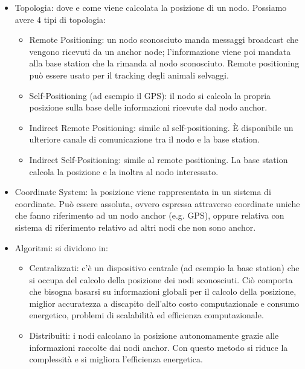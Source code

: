 \begin{itemize}
    \item Topologia: dove e come viene calcolata la posizione di un
    nodo. Possiamo avere 4 tipi di topologia:
    \begin{itemize}
        \item Remote Positioning: un nodo sconosciuto
        manda messaggi broadcast che vengono ricevuti da un anchor node; l'informazione
        viene poi mandata alla base station che la rimanda al nodo sconosciuto. Remote
        positioning può essere usato per il tracking degli animali selvaggi.
        \item Self-Positioning (ad esempio il GPS): il
        nodo si calcola la propria posizione sulla base delle informazioni ricevute dal
        nodo anchor.
        \item Indirect Remote Positioning: simile al
        self-positioning. È disponibile un ulteriore canale di comunicazione tra il nodo
        e la base station.
        \item Indirect Self-Positioning: simile al
        remote positioning. La base station calcola la posizione e la inoltra al nodo
        interessato.
    \end{itemize}
    \item Coordinate System: la posizione viene rappresentata in un
    sistema di coordinate. Può essere assoluta, ovvero espressa attraverso
    coordinate uniche che fanno riferimento ad un nodo anchor (e.g. GPS), oppure
    relativa con sistema di riferimento relativo ad altri nodi che non sono anchor.
    \item Algoritmi: si dividono in:
    \begin{itemize}
        \item Centralizzati: c'è un dispositivo centrale (ad
        esempio la base station) che si occupa del calcolo della posizione dei nodi
        sconosciuti. Ciò comporta che bisogna basarsi su informazioni globali per il
        calcolo della posizione, miglior accuratezza a discapito dell'alto costo
        computazionale e consumo energetico, problemi di scalabilità ed efficienza
        computazionale.
        \item Distribuiti: i nodi calcolano la posizione
        autonomamente grazie alle informazioni raccolte dai nodi anchor. Con questo
        metodo si riduce la complessità e si migliora l'efficienza energetica.
    \end{itemize}


\end{itemize}
